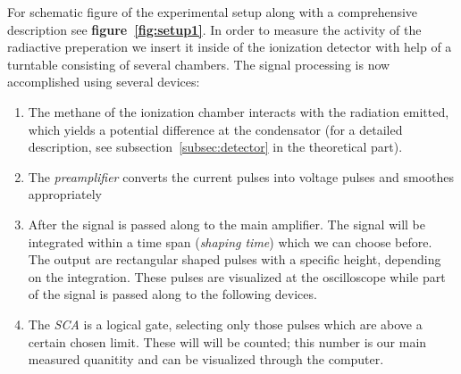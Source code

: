 For schematic figure of the experimental setup along with a comprehensive
description see \textbf{figure~\ref{fig:setup1}}. In order to measure the activity of
the radiactive preperation we insert it inside of the ionization detector with
help of a turntable consisting of several chambers. The signal processing is now
accomplished using several devices: 
\begin{enumerate}
\item The methane of the ionization chamber 
interacts with the radiation emitted, which yields a potential difference
at the condensator (for a detailed description, 
see subsection~\ref{subsec:detector}
in the theoretical part).
\item The \textit{preamplifier} converts the current pulses into voltage pulses
and smoothes appropriately
\item After the signal is passed along to the main amplifier. The signal
will be integrated within a time span (\textit{shaping time}) which we can
choose before. The output are rectangular shaped pulses with a specific 
height, depending on the integration. These pulses are visualized at the
oscilloscope while part of the signal is passed along to the following devices.
\item The \textit{SCA} is a logical gate, selecting only those pulses which
are above a certain chosen limit. These will will be counted; this number is
our main measured quanitity and can be visualized through the computer.
\end{enumerate}

